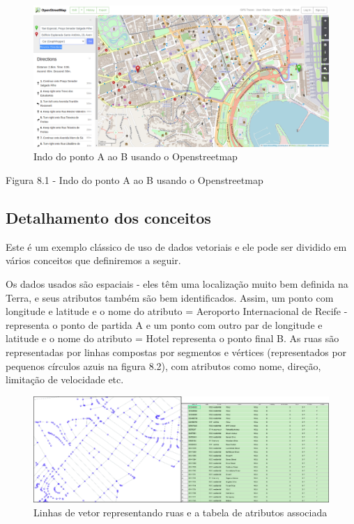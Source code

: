\documentclass[
  portuguese,
]{krantz}
\begin{document}
\begin{figure}
\centering
\includegraphics{media/modulo8/fig81.png}
\caption{Indo do ponto A ao B usando o Openstreetmap}
\end{figure}

Figura 8.1 - Indo do ponto A ao B usando o Openstreetmap

\hypertarget{detalhamento-dos-conceitos-4}{%
\subsection{Detalhamento dos conceitos}\label{detalhamento-dos-conceitos-4}}

Este é um exemplo clássico de uso de dados vetoriais e ele pode ser dividido em vários conceitos que definiremos a seguir.

Os dados usados \hspace{0pt}\hspace{0pt}são espaciais - eles têm uma localização muito bem definida na Terra, e seus atributos também são bem identificados. Assim, um ponto com longitude e latitude e o nome do atributo = Aeroporto Internacional de Recife - representa o ponto de partida A e um ponto com outro par de longitude e latitude e o nome do atributo = Hotel representa o ponto final B. As ruas são representadas por linhas compostas por segmentos e vértices (representados por pequenos círculos azuis na figura 8.2), com atributos como nome, direção, limitação de velocidade etc.

\begin{figure}
\centering
\includegraphics{media/modulo8/fig82.png}
\caption{Linhas de vetor representando ruas e a tabela de atributos associada}
\end{figure}
\end{document}
